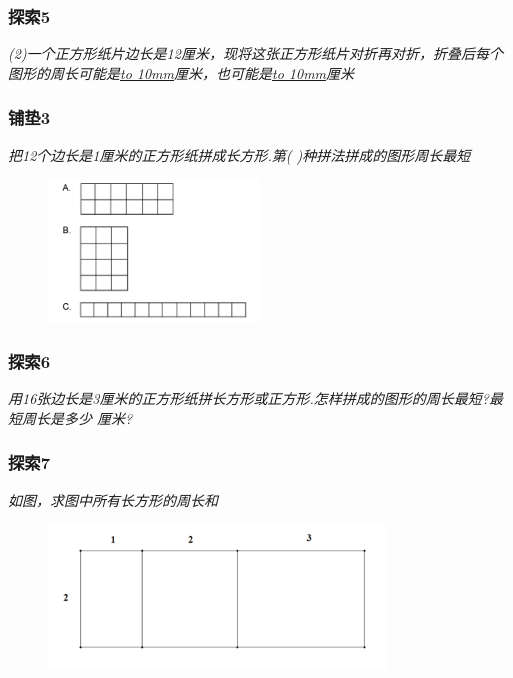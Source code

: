 \begin{frame}
    \frametitle{探索5}
    \textit{(2)一个正方形纸片边长是12厘米，现将这张正方形纸片对折再对折，折叠后每个图形的周长可能是\underline{\hbox to 10mm{}}厘米，也可能是\underline{\hbox to 10mm{}}厘米}
\end{frame}

\begin{frame}
    \frametitle{铺垫3}
    \textit{把12个边长是1厘米的正方形纸拼成长方形.第( )种拼法拼成的图形周长最短}
    \begin{figure}[H] 
        \centering
        \includegraphics[width=0.5\textwidth]{./pics/Chapter_1/pudian3.png}
    \end{figure}
\end{frame}

\begin{frame}
    \frametitle{探索6}
    \textit{用16张边长是3厘米的正方形纸拼长方形或正方形.怎样拼成的图形的周长最短?最短周长是多少
    厘米?}
\end{frame}

\begin{frame}
    \frametitle{探索7}
    \textit{如图，求图中所有长方形的周长和}
    \begin{figure}[H] 
        \centering
        \includegraphics[width=0.8\textwidth]{./pics/Chapter_1/tansuo7.png}
    \end{figure}
\end{frame}

